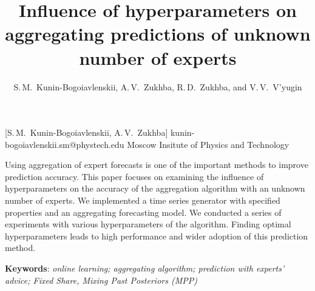 \documentclass[12pt, twoside]{article}
\begin{document}
\English

\title
	[My first scientific paper] %
    {Influence of hyperparameters on aggregating predictions of unknown number of experts} %
\author
	[S.\,M.~Kunin-Bogoiavlenskii] %
	{S.\,M.~Kunin-Bogoiavlenskii, A.\,V.~Zukhba, R.\,D.~Zukhba, and V.\,V.~V’yugin} %
    [S.\,M.~Kunin-Bogoiavlenskii, A.\,V.~Zukhba] %
\email
    {kunin-bogoiavlenskii.sm@phystech.edu}
\organization
    {Moscow Insitute of Physics and Technology}
\abstract
    {
    
	Using aggregation of expert forecasts is one of the important methods to improve prediction accuracy. 
	This paper focuses on examining the influence of hyperparameters on the accuracy of the aggregation algorithm with an unknown number of experts.
	We implemented a time series generator with specified properties and an aggregating forecasting model. 
	We conducted a series of experiments with various hyperparameters of the algorithm.
	Finding optimal hyperparameters leads to high performance and wider adoption of this prediction method.
	    	
%	
%	
%	
%				
	\noindent
    	\textbf{Keywords}: \emph{online learning; aggregating algorithm; prediction with experts’ advice; Fixed Share, Mixing Past Posteriors (MPP)}}


\maketitle
\end{document}
